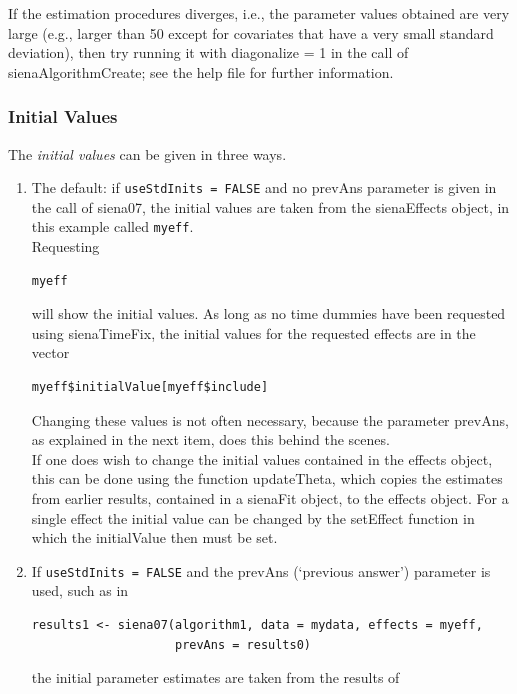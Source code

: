 \documentclass[a4paper,fleqn,11pt]{article}
\newcommand{\+}{\, + \,}
\newcommand{\sfn}[1]{\textsf{#1}}
\begin{document}
If the estimation procedures diverges, i.e., the parameter values obtained
are very large (e.g., larger than 50 except for covariates that have
a very small standard deviation), then try running it with
\sfn{diagonalize = 1} in the call of \sfn{sienaAlgorithmCreate};
see the help file for further information.

\subsubsection{Initial Values}
\label{S_initials}

The \emph{initial values} can be given in three ways.
\begin{enumerate}
\item The default: if \texttt{useStdInits = FALSE} and no \textsf{prevAns}
      parameter is given in the call of \textsf{siena07},
      the initial values are taken from the \textsf{sienaEffects} object,
      in this example called \texttt{myeff}.\\
      Requesting
\begin{verbatim}
myeff
\end{verbatim}
      will show the initial values.
      As long as no time dummies have been requested
      using \textsf{sienaTimeFix}, the initial values for the requested
      effects are in the vector
\begin{verbatim}
myeff$initialValue[myeff$include]
\end{verbatim}
      Changing these values is not often necessary, because the
      parameter \textsf{prevAns}, as explained in the next item,
      does this behind the scenes.\\
       If one does wish to change the initial values contained in
      the effects object, this can be done using the
      function \textsf{updateTheta}, which copies the
      estimates from earlier results, contained in a
      \sfn{sienaFit} object, to the effects object.
      For a single effect the initial value can be changed
      by the \textsf{setEffect}
      function in which the \textsf{initialValue} then must be set.
\item If \texttt{useStdInits = FALSE} and the \textsf{prevAns}
      (`previous answer')
      parameter is used, such as in
      \begin{verbatim}
results1 <- siena07(algorithm1, data = mydata, effects = myeff,
                    prevAns = results0)
      \end{verbatim}
      the initial parameter estimates are taken from the results of

\end{enumerate}
\end{document}

